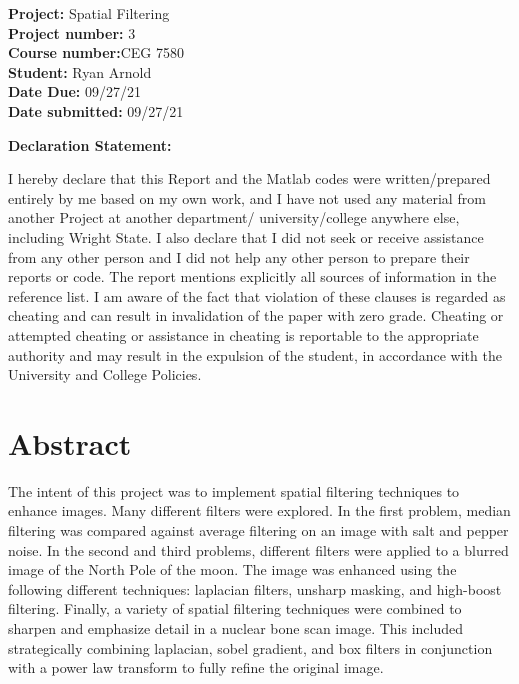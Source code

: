 \documentclass[./rarnold_report3.tex]{subfiles}
\begin{document}


\begin{titlepage}

\noindent
\textbf{Project:} Spatial Filtering \\
\textbf{Project number:} 3\\
\textbf{Course number:}CEG 7580\\
\textbf{Student:} Ryan Arnold \\
\textbf{Date Due:} 09/27/21 \\
\textbf{Date submitted:} 09/27/21
\vspace{24pt}

\noindent \textbf{Declaration Statement: }

\noindent I hereby declare that this Report and the Matlab codes were written/prepared entirely by me based on my own work, and I have not used any material from another Project at another department/ university/college anywhere else, including Wright State. I also declare that I did not seek or receive assistance from any other person and I did not help any other person to prepare their reports or code.  The report mentions explicitly all sources of information in the reference list. I am aware of the fact that violation of these clauses is regarded as cheating and can result in invalidation of the paper with zero grade. Cheating or attempted cheating or assistance in cheating is reportable to the appropriate authority and may result in the expulsion of the student, in accordance with the University and College Policies.

\end{titlepage}

\clearpage
\section*{Abstract}

\noindent The intent of this project was to implement spatial filtering techniques to enhance images.  Many different filters were explored.  In the first problem, median filtering was compared against average filtering on an image with salt and pepper noise.  In the second and third problems, different filters were applied to a blurred image of the North Pole of the moon.  The image was enhanced using the following different techniques: laplacian filters, unsharp masking, and high-boost filtering.  Finally, a variety of spatial filtering techniques were combined to sharpen and emphasize detail in a nuclear bone scan image.  This included strategically combining laplacian, sobel gradient, and box filters in conjunction with a power law transform to fully refine the original image.
\end{document}
